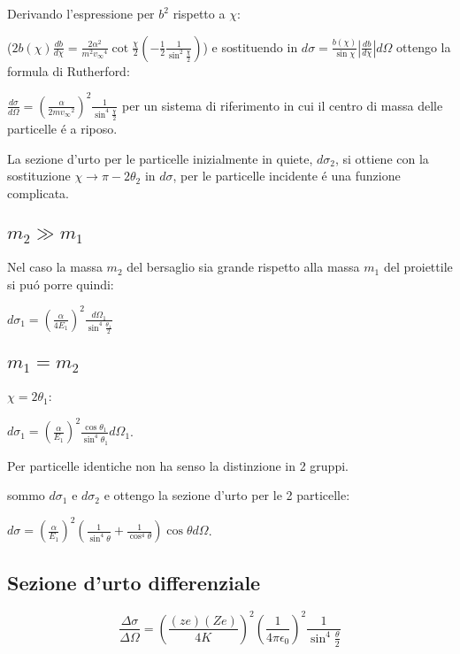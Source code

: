\documentclass[main.tex]{subfiles}
\begin{document}
Derivando l'espressione per $b^2$ rispetto a $\chi$:

($2b(\chi)\frac{db}{d\chi}=\frac{2\alpha^2}{m^2{v_{\infty}}^4}\cot{\frac{\chi}{2}}(-\frac{1}{2}\frac{1}{\sin^2{\frac{\chi}{2}}})$) e sostituendo in $d\sigma=\frac{b(\chi)}{\sin{\chi}}|\frac{db}{d\chi}|d\Omega$ ottengo la formula di Rutherford:

$\frac{d\sigma}{d\Omega}=(\frac{\alpha}{2m{v_{\infty}}^2})^2\frac{1}{\sin^4{\frac{\chi}{2}}}$ per un sistema di riferimento in cui il centro di massa delle particelle \'e a riposo.

La sezione d'urto per le particelle inizialmente in quiete, $d\sigma_2$, si ottiene con la sostituzione $\chi\rightarrow\pi-2\theta_2$ in $d\sigma$, per le particelle incidente \'e una funzione complicata.

 \subsection{$m_2\gg m_1$}
Nel caso la massa $m_2$ del bersaglio sia grande rispetto alla massa $m_1$ del proiettile si pu\'o porre  quindi:

$d\sigma_1=(\frac{\alpha}{4E_1})^2\frac{d\Omega_1}{\sin^4{\frac{\theta_1}{2}}}$

\subsection{$m_1=m_2$}
$\chi=2\theta_1$:

$d\sigma_1=(\frac{\alpha}{E_1})^2\frac{\cos{\theta_1}}{\sin^4{\theta_1}}d\Omega_1$.

Per particelle identiche non ha senso la distinzione in 2 gruppi.

sommo $d\sigma_1$ e $d\sigma_2$ e ottengo la sezione d'urto per le 2 particelle:

$d\sigma=(\frac{\alpha}{E_1})^2(\frac{1}{\sin^4{\theta}}+\frac{1}{\cos^4{\theta}})\cos{\theta}d\Omega$.



\subsection{Sezione d'urto differenziale} 

\begin{equation*}
\frac{\Delta \sigma}{\Delta\Omega}=(\frac{(ze)(Ze)}{4K})^2(\frac{1}{4\pi\epsilon_0})^2\frac{1}{\sin^{4}{\frac{\theta}{2}}}
\end{equation*}
\end{document}
